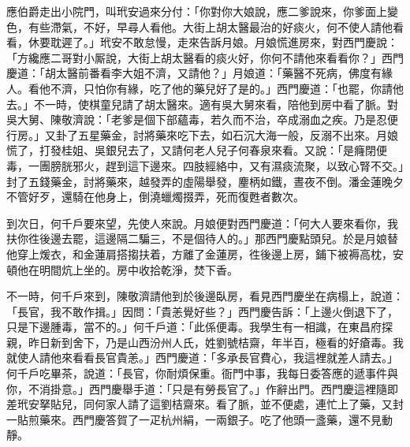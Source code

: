應伯爵走出小院門，叫玳安過來分付：「你對你大娘說，應二爹說來，你爹面上變色，有些滯氣，不好，早尋人看他。大街上胡太醫最治的好痰火，{}何不使人請他看看，休要耽遲了。」玳安不敢怠慢，走來告訴月娘。月娘慌進房來，對西門慶說：「方纔應二哥對小厮說，大街上胡太醫看的痰火好，你何不請他來看看你？」西門慶道：「胡太醫前番看李大姐不濟，又請他？」月娘道：「藥醫不死病，佛度有緣人。看他不濟，只怕你有緣，吃了他的藥兒好了是的。」{}西門慶道：「也罷，你請他去。」不一時，使棋童兒請了胡太醫來。適有吳大舅來看，陪他到房中看了脈。對吳大舅、陳敬濟說：「老爹是個下部蘊毒，若久而不治，卒成溺血之疾。乃是忍便行房。」又卦了五星藥金，討將藥來吃下去，如石沉大海一般，反溺不出來。月娘慌了，打發桂姐、吳銀兒去了，又請何老人兒子何春泉來看。又說：「是癃閉便毒，一團膀胱邪火，趕到這下邊來。四肢經絡中，又有濕痰流聚，以致心腎不交。」{}封了五錢藥金，討將藥來，越發弄的虛陽舉發，麈柄如鐵，晝夜不倒。潘金蓮晚夕不管好歹，還騎在他身上，倒澆蠟燭掇弄，死而復甦者數次。{}

到次日，何千戶要來望，先使人來說。月娘便對西門慶道：「何大人要來看你，我扶你徃後邊去罷，{}這邊隔二騙三，不是個待人的。」那西門慶點頭兒。於是月娘替他穿上煖衣，和金蓮肩搭搊扶着，方離了金蓮房，徃後邊上房，鋪下被褥高枕，安頓他在明間炕上坐的。房中收拾乾淨，焚下香。

不一時，何千戶來到，陳敬濟請他到於後邊臥房，看見西門慶坐在病榻上，說道：「長官，我不敢作揖。」因問：「貴恙覺好些？」西門慶告訴：「上邊火倒退下了，只是下邊腫毒，當不的。」何千戶道：「此係便毒。我學生有一相識，在東昌府探親，昨日新到舍下，乃是山西汾州人氏，姓劉號桔齋，年半百，極看的好瘡毒。我就使人請他來看看長官貴恙。」西門慶道：「多承長官費心，我這裡就差人請去。」何千戶吃畢茶，說道：「長官，你耐煩保重。衙門中事，我每日委答應的遞事件與你，不消掛意。」西門慶舉手道：「只是有勞長官了。」作辭出門。西門慶這裡隨即差玳安拏貼兒，同何家人請了這劉桔齋來。看了脈，並不便處，連忙上了藥，又封一貼煎藥來。西門慶答賀了一疋杭州絹，一兩銀子。吃了他頭一盞藥，還不見動靜。

